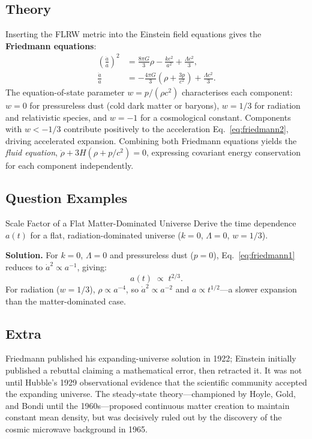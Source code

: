 \subsection{Theory}

\begin{theory}
Inserting the FLRW metric into the Einstein field equations gives the
\textbf{Friedmann equations}:
\begin{align}
  \left(\frac{\dot{a}}{a}\right)^{\!2}
    &= \frac{8\pi G}{3}\rho - \frac{kc^2}{a^2} + \frac{\Lambda c^2}{3},
    \label{eq:friedmann1}\\[6pt]
  \frac{\ddot{a}}{a}
    &= -\frac{4\pi G}{3}\!\left(\rho + \frac{3p}{c^2}\right) + \frac{\Lambda c^2}{3}.
    \label{eq:friedmann2}
\end{align}
The equation-of-state parameter $w = p/(\rho c^2)$ characterises each component:
$w=0$ for pressureless dust (cold dark matter or baryons), $w=1/3$ for radiation
and relativistic species, and $w=-1$ for a cosmological constant.
Components with $w < -1/3$ contribute positively to the acceleration
Eq.~\eqref{eq:friedmann2}, driving accelerated expansion.
Combining both Friedmann equations yields the \emph{fluid equation},
$\dot\rho + 3H(\rho + p/c^2) = 0$, expressing covariant energy conservation for
each component independently.
\end{theory}

\subsection{Question Examples}

\begin{example}{Scale Factor of a Flat Matter-Dominated Universe}{}
Derive the time dependence $a(t)$ for a flat, radiation-dominated universe
($k=0$, $\Lambda=0$, $w=1/3$).

\medskip\textbf{Solution.}\quad
For $k=0$, $\Lambda=0$ and pressureless dust ($p=0$), Eq.~\eqref{eq:friedmann1}
reduces to $\dot{a}^2 \propto a^{-1}$, giving:
\begin{equation}
  a(t) \;\propto\; t^{2/3}.
\end{equation}
For radiation ($w=1/3$), $\rho\propto a^{-4}$, so $\dot a^2 \propto a^{-2}$ and
$a \propto t^{1/2}$—a slower expansion than the matter-dominated case.
\end{example}

\subsection{Extra}

\begin{extra}
Friedmann published his expanding-universe solution in 1922; Einstein initially
published a rebuttal claiming a mathematical error, then retracted it.
It was not until Hubble's 1929 observational evidence that the scientific community
accepted the expanding universe.
The steady-state theory—championed by Hoyle, Gold, and Bondi until the
1960s—proposed continuous matter creation to maintain constant mean density,
but was decisively ruled out by the discovery of the cosmic microwave background
in 1965.
\end{extra}

\clearpage
